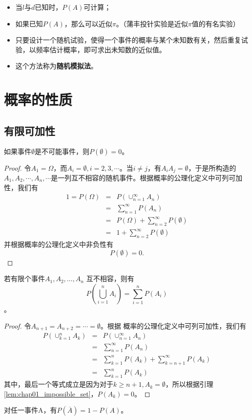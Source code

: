 \begin{remark}
  \begin{itemize}
    \item 当$l$与$d$已知时，$P(A)$可计算；
    \item 如果已知$P(A)$，那么可以近似$\pi$。（蒲丰投针实验是近似$\pi$值的有名实验）
    \item 只要设计一个随机试验，使得一个事件的概率与某个未知数有关，然后重复试验，以频率估计概率，即可求出未知数的近似值。
    \item 这个方法称为\textbf{随机模拟法}。
\end{itemize}  
\end{remark}


\section{概率的性质}
\subsection{有限可加性}
\begin{lemma}\label{lem:chap01_impossible_set}
如果事件$\emptyset$是不可能事件，则$P(\emptyset)=0$。
\end{lemma}
\begin{proof}
    令$A_1 = \Omega$，而$A_i = \emptyset,i=2,3,\cdots$。当$i\neq j$，有$A_i A_j = \emptyset$，于是所构造的$A_1,A_2,\cdots,A_n,\cdots$是一列互不相容的随机事件。根据概率的公理化定义中可列可加性，我们有
    \begin{eqnarray*}
        1 = P(\Omega) &=& P(\cup_{n=1}^\infty A_n)\\
        &=& \sum_{n=1}^\infty P(A_n)\\
        &=& P(\Omega) + \sum_{n=2}^\infty P(\emptyset)\\
        &= & 1 + \sum_{n=2}^\infty P(\emptyset)
    \end{eqnarray*}
    并根据概率的公理化定义中非负性有
    $$
    P(\emptyset) = 0.
    $$
\end{proof}
\begin{theorem}[有限可加性]\label{thm:chap01_finite_additivity}
若有限个事件$A_{1} ,A_{2} ,\dots ,A_{n} $ 互不相容，则有$$P\left(\bigcup_{i=1}^{n}A_{i}  \right)=\sum_{i=1}^{n } P(A_{i} )$$。
\end{theorem}
\begin{proof}
令$A_{n+1} = A_{n+2} = \cdots = \emptyset$。根据
概率的公理化定义中可列可加性，我们有
\begin{eqnarray*}
    P(\cup_{k=1}^n A_k) &=& P(\cup_{n=1}^\infty A_n)\\
    &=& \sum_{n=1}^\infty P(A_n)\\
    &=& \sum_{k=1}^n P(A_k) + \sum_{k=n+1}^\infty P(A_k)\\
    &=& \sum_{k=1}^n P(A_k)
\end{eqnarray*}
其中，最后一个等式成立是因为对于$k\geq n+1,A_k = \emptyset$，所以根据引理\ref{lem:chap01_impossible_set}，$P(A_k)=0$。
\end{proof}
\begin{corollary}
对任一事件A，有$P(\overline{A} )=1-P(A)$。
\end{corollary}
